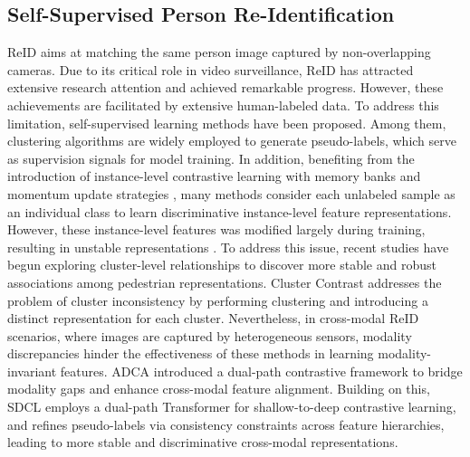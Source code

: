 \subsection{Self-Supervised Person Re-Identification}
ReID \cite{10703072,9585547} aims at matching the same person image captured by non-overlapping cameras. Due to its critical role in video surveillance, ReID has attracted extensive research attention and achieved remarkable progress. However, these achievements are facilitated by extensive human-labeled data. To address this limitation, self-supervised learning methods \cite{yin2023real,9840394} have been proposed. Among them, clustering algorithms are widely employed to generate pseudo-labels, which serve as supervision signals for model training. In addition, benefiting from the introduction of instance-level contrastive learning \cite{Wu_2018_CVPR} with memory banks and momentum update strategies \cite{He_2020_CVPR}, many methods \cite{chen2021ice,wang2022optimal} consider each unlabeled sample as an individual class to learn discriminative instance-level feature representations. However, these instance-level features was modified largely during training, resulting in unstable representations \cite{10882953}. To address this issue, recent studies \cite{Yang_2023_ICCV,cheng2023efficient} have begun exploring cluster-level relationships to discover more stable and robust associations among pedestrian representations. Cluster Contrast \cite{dai2022cluster} addresses the problem of cluster inconsistency by performing clustering and introducing a distinct representation for each cluster. Nevertheless, in cross-modal ReID scenarios, where images are captured by heterogeneous sensors, modality discrepancies hinder the effectiveness of these methods in learning modality-invariant features. ADCA\cite{adca} introduced a dual-path contrastive framework to bridge modality gaps and enhance cross-modal feature alignment. Building on this, SDCL \cite{yang2024shallow} employs a dual-path Transformer for shallow-to-deep contrastive learning, and refines pseudo-labels via consistency constraints across feature hierarchies, leading to more stable and discriminative cross-modal representations.

